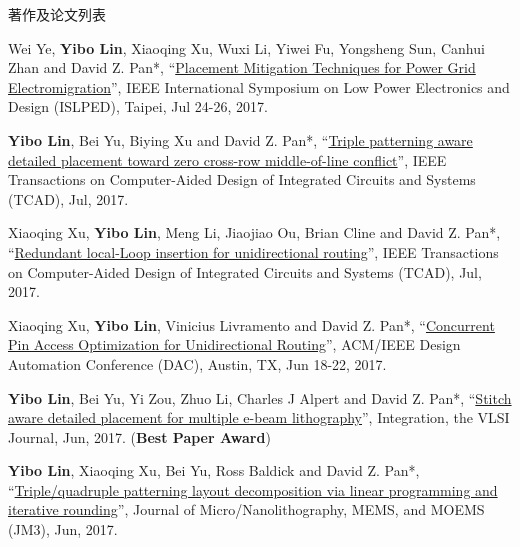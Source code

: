 \begin{rSection}{著作及论文列表}
\begin{description}[font=\normalfont, rightmargin=2em]
{}
            

\item[{[C17]}]{
        Wei Ye, \textbf{Yibo Lin}, Xiaoqing Xu, Wuxi Li, Yiwei Fu, Yongsheng Sun, Canhui Zhan and David Z. Pan*, 
    ``\href{https://doi.org/10.1109/ISLPED.2017.8009178}{Placement Mitigation Techniques for Power Grid Electromigration}'', 
    IEEE International Symposium on Low Power Electronics and Design (ISLPED), Taipei, Jul 24-26, 2017.
    
}
            

\item[{[J16]}]{
        \textbf{Yibo Lin}, Bei Yu, Biying Xu and David Z. Pan*, 
    ``\href{http://dx.doi.org/10.1109/TCAD.2017.2648843}{Triple patterning aware detailed placement toward zero cross-row middle-of-line conflict}'', 
    IEEE Transactions on Computer-Aided Design of Integrated Circuits and Systems (TCAD), Jul, 2017.
    
}
            

\item[{[J15]}]{
        Xiaoqing Xu, \textbf{Yibo Lin}, Meng Li, Jiaojiao Ou, Brian Cline and David Z. Pan*, 
    ``\href{http://dx.doi.org/10.1109/TCAD.2017.2651811}{Redundant local-Loop insertion for unidirectional routing}'', 
    IEEE Transactions on Computer-Aided Design of Integrated Circuits and Systems (TCAD), Jul, 2017.
    
}
            

\item[{[C14]}]{
        Xiaoqing Xu, \textbf{Yibo Lin}, Vinicius Livramento and David Z. Pan*, 
    ``\href{https://doi.org/10.1145/3061639.3062214}{Concurrent Pin Access Optimization for Unidirectional Routing}'', 
    ACM/IEEE Design Automation Conference (DAC), Austin, TX, Jun 18-22, 2017.
    
}
            

\item[{[J13]}]{
        \textbf{Yibo Lin}, Bei Yu, Yi Zou, Zhuo Li, Charles J Alpert and David Z. Pan*, 
    ``\href{http://dx.doi.org/10.1016/j.vlsi.2017.02.004}{Stitch aware detailed placement for multiple e-beam lithography}'', 
    Integration, the VLSI Journal, Jun, 2017.
    (\textbf{Best Paper Award})
}
            

\item[{[J12]}]{
        \textbf{Yibo Lin}, Xiaoqing Xu, Bei Yu, Ross Baldick and David Z. Pan*, 
    ``\href{http://dx.doi.org/10.1117/1.JMM.16.2.023507}{Triple/quadruple patterning layout decomposition via linear programming and iterative rounding}'', 
    Journal of Micro/Nanolithography, MEMS, and MOEMS (JM3), Jun, 2017.
    
}
\end{description}
\end{rSection}
